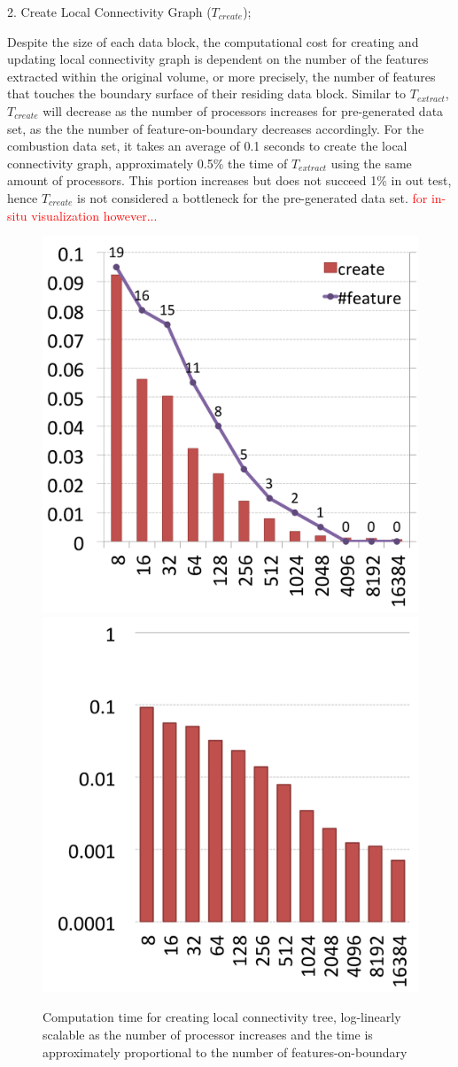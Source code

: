 \documentclass[10pt, conference, compsocconf]{IEEEtran}
\begin{document}
2. Create Local Connectivity Graph ($T_{create}$);

Despite the size of each data block, the computational cost for creating and updating local connectivity graph is dependent on the number of the features extracted within the original volume, or more precisely, the number of features that touches the boundary surface of their residing data block. Similar to $T_{extract}$, $T_{create}$ will decrease as the number of processors increases for pre-generated data set, as the the number of feature-on-boundary decreases accordingly. For the combustion data set, it takes an average of 0.1 seconds to create the local connectivity graph, approximately 0.5\% the time of $T_{extract}$ using the same amount of processors. This portion increases but does not succeed 1\% in out test, hence $T_{create}$ is not considered a bottleneck for the pre-generated data set. \textcolor{red}{for in-situ visualization however... }

\begin{figure}[ht]
	\centering
	\includegraphics[width=0.45\linewidth]{create_local_graph.png}
	\includegraphics[width=0.45\linewidth]{create_local_graph_log.png}
	\caption{Computation time for creating local connectivity tree, log-linearly scalable as the number of processor increases and the time is approximately proportional to the number of features-on-boundary}
	\label{fig:create-local-graph}
\end{figure}
\end{document}
